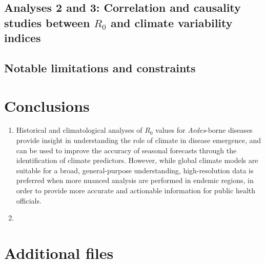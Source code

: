 \documentclass[10pt,twocolumn]{wlscirep}
\begin{document}
\subsection{Analyses 2 and 3: Correlation and causality studies between $R_0$ and climate variability indices} \label{sec-discussion-analysis-2-3}

\subsection{Notable limitations and constraints} \label{sec-discussion-limitations}

\section{Conclusions} \label{sec-conclusions}

\begin{enumerate}
  \item Historical and climatological analyses of $R_0$ values for \textit{Aedes}-borne diseases provide insight in understanding the role of climate in disease emergence, and can be used to improve the accuracy of seasonal forecasts through the identification of climate predictors. However, while global climate models are suitable for a broad, general-purpose understanding, high-resolution data is preferred when more nuanced analysis are performed in endemic regions, in order to provide more accurate and actionable information for public health officials.
  \item
\end{enumerate}

\section{Additional files} \label{sec-additional-files}
\end{document}
